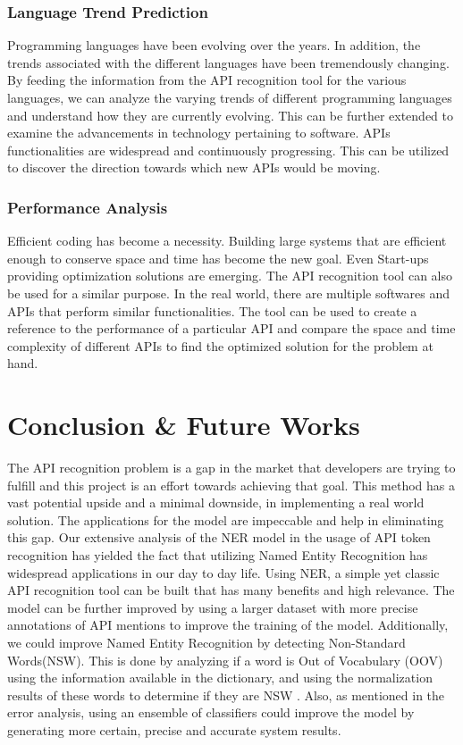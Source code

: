 \documentclass{sig-alternate-05-2015}
\begin{document}
\subsubsection{Language Trend Prediction}
Programming languages have been evolving over the years. In addition, the trends associated with the different languages have been tremendously changing. By feeding the information from the API recognition tool for the various languages, we can analyze the varying trends of different programming languages and understand how they are currently evolving. This can be further extended to examine the advancements in technology pertaining to software. APIs functionalities are widespread and continuously progressing. This can be utilized to discover the direction towards which new APIs would be moving. 

\subsubsection{Performance Analysis}
Efficient coding has become a necessity. Building large systems that are efficient enough to conserve space and time has become the new goal. Even Start-ups providing optimization solutions are emerging. The API recognition tool can also be used for a similar purpose. In the real world, there are multiple softwares and APIs that perform similar functionalities. The tool can be used to create a reference to the performance of a particular API and compare the space and time complexity of different APIs to find the optimized solution for the problem at hand. 

\section{Conclusion \& Future Works}
The API recognition problem is a gap in the market that developers are trying to fulfill and this project is an effort towards achieving that goal. This method has a vast potential upside and a minimal downside, in implementing a real world solution. The applications for the model are impeccable and help in eliminating this gap. Our extensive analysis of the NER model in the usage of API token recognition has yielded the fact that utilizing Named Entity Recognition has widespread applications in our day to day life. Using NER, a simple yet classic API recognition tool can be built that has many benefits and high relevance. The model can be further improved by using a larger dataset with more precise annotations of API mentions to improve the training of the model. Additionally, we could improve Named Entity Recognition by detecting Non-Standard Words(NSW). This is done by analyzing if a word is Out of Vocabulary (OOV) using the information available in the dictionary, and using the normalization results of these words to determine if they are NSW \cite{liimproving}. Also, as mentioned in the error analysis, using an ensemble of classifiers could improve the model by generating more certain, precise and accurate system results.


\end{document}
